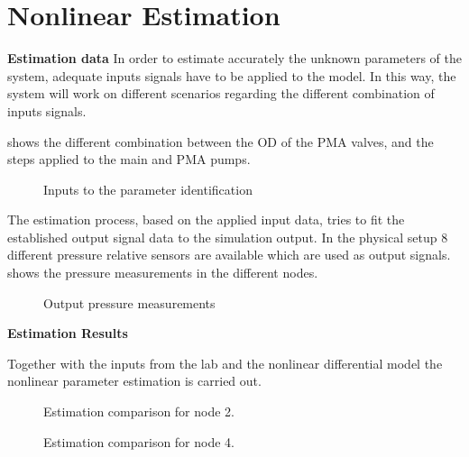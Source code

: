 \chapter{Nonlinear Estimation}
\label{NonLinResults}

\textbf{Estimation data}
In order to estimate accurately the unknown parameters of the system, adequate inputs signals have to be applied to the model. In this way, the system 
will work on different scenarios regarding the different combination of inputs signals. 

 shows the different combination between the OD of the PMA valves, and the steps applied to the main and PMA pumps. 

\begin{figure}[H]
\centering
\resizebox{0.75\linewidth}{!}{}
% 
\caption{Inputs to the parameter identification}
\label{systemdiagram}
\end{figure} 

The estimation process, based on the applied input data, tries to fit the established output signal data to the simulation output. In the physical setup $8$ 
different pressure relative sensors are available which are used as output signals.  shows the pressure measurements in the different 
nodes.

\begin{figure}[H]
\centering
\resizebox{0.75\linewidth}{!}{}
% 
\caption{Output pressure measurements}
\label{systemdiagram1}
\end{figure} 

\textbf{Estimation Results}

Together with the inputs from the lab and the nonlinear differential model the nonlinear parameter estimation is carried out. 

\begin{figure}[H]
  \centering
  \begin{minipage}[b]{0.45\textwidth}
    
    \caption{Estimation comparison for node 2.}
  \end{minipage}
  \hfill
  \begin{minipage}[b]{0.45\textwidth}
    
    \caption{Estimation comparison for node 4.}
  \end{minipage}
\end{figure}

